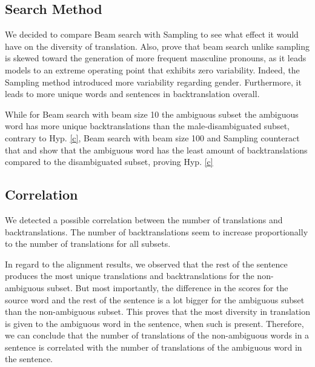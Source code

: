 \subsection{Search Method} %

We decided to compare Beam search with Sampling to see what effect it would have on the diversity of translation. Also, \citet{roberts2020decoding} prove that beam search unlike sampling is skewed toward the generation of more frequent masculine pronouns, as it leads models to an extreme operating point that exhibits zero variability. Indeed, the Sampling method introduced more variability regarding gender. Furthermore, it leads to more unique words and sentences in backtranslation overall. 

While for Beam search with beam size 10 the ambiguous subset the ambiguous word has more unique backtranslations than the male-disambiguated subset, contrary to Hyp. \ref{c}, Beam search with beam size 100 and Sampling counteract that and show that the ambiguous word has the least amount of backtranslations compared to the disambiguated subset, proving Hyp. \ref{c}


\subsection{Correlation} 

We detected a possible correlation between the number of translations and backtranslations. The number of backtranslations seem to increase proportionally to the number of translations for all subsets.

In regard to the alignment results, we observed that the rest of the sentence produces the most unique translations and backtranslations for the non-ambiguous subset. But most importantly, the difference in the scores for the source word and the rest of the sentence is a lot bigger for the ambiguous subset than the non-ambiguous subset. This proves that the most diversity in translation is given to the ambiguous word in the sentence, when such is present. Therefore, we can conclude that the number of translations of the non-ambiguous words in a sentence is correlated with the number of translations of the ambiguous word in the sentence.



